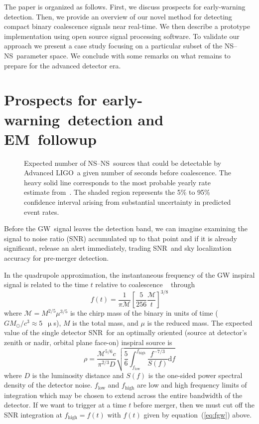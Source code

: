 \documentclass[preprint2]{aastex}
\newcommand{\earlywarning}{early-warning}
\newcommand{\NS}{NS}
\newcommand{\GW}{GW}%
\newcommand{\EM}{EM}%
\newcommand{\LIGO}{LIGO}%
\newcommand{\SNR}{SNR}%
\begin{document}
The paper is organized as follows.  First, we discuss prospects for
early-warning detection.  Then, we provide an overview of our novel
method for detecting compact binary coalescence signals near real-time.
We then describe a prototype implementation using open source signal
processing software.  To validate our approach we present a case study
focusing on a particular subset of the \NS--\NS\ parameter space.  We
conclude with some remarks on what remains to prepare for the advanced
detector era.

\section{Prospects for \earlywarning\ detection and \EM\ followup}

\begin{figure}[h]
\caption{\label{fig:earlywarning}Expected number of \NS--\NS\
sources that could be detectable by Advanced \LIGO\ a given number of seconds
before coalescence.  The heavy solid line corresponds to the most probable yearly rate
estimate from~\citet{Abadie:2010p10836}.  The shaded region represents the 5\% to 95\% confidence interval
arising from substantial uncertainty in predicted event rates.}
\end{figure}
%
Before the \GW\ signal leaves the detection band, we can imagine examining the
signal to noise ratio (\SNR) accumulated up to that point and if it is
already significant, release an alert immediately, trading \SNR\ and sky
localization accuracy for pre-merger detection.

In the quadrupole approximation, the instantaneous frequency of the GW inspiral signal is related to the time $t$ relative to coalescence ~\citep{kidder1992, findchirppaper} through
%
\begin{equation} \label{eq:fgw}
	f(t) = \frac{1}{\pi \mathcal{M}}
		\left[ \frac{5}{256}\frac{\mathcal{M}}{t} \right]^{3/8}
\end{equation}
%
where $\mathcal{M} = M^{2/5} \mu^{3/5}$ is the chirp mass of the binary in units of time ($G
M_\odot / c^3 \approx 5$~$\upmu$s), $M$ is the total mass, and $\mu$ is the reduced mass. 
The expected value of the single detector \SNR\ for an optimally oriented (source at detector's zenith or nadir, orbital plane face-on) inspiral source is~\citep{Abadie:2010p10836}
%
\begin{equation}
	\label{eq:expected-snr}
	\rho =
		\frac{\mathcal{M}^{5/6} c}{\pi^{2/3} D}
		\sqrt{
			\frac{5}{6} \int_{f_\mathrm{low}}^{f_\mathrm{high}}
			\frac{f^{-7/3}}{S(f)} \mathrm{d}f}
\end{equation}
%
where $D$ is the luminosity distance and $S(f)$ is the one-sided power spectral density of the detector noise.  $f_\mathrm{low}$ and $f_\mathrm{high}$ are low and high frequency limits of integration which may be chosen to extend across the entire bandwidth of the detector.  If we want to trigger at a time $t$ before merger, then we must cut off the SNR integration at $f_\mathrm{high} = f(t)$ with $f(t)$ given by equation~(\ref{eq:fgw}) above.
\end{document}
